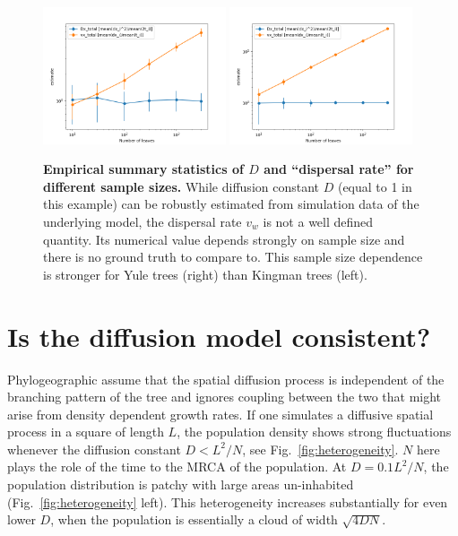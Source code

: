 \documentclass[aps,rmp, onecolumn]{revtex4}
\begin{document}
\begin{figure}
    \includegraphics*[width=0.48\textwidth]{figures/kingman_total_dispersal.png}
    \includegraphics*[width=0.48\textwidth]{figures/yule_total_dispersal.png}
    \caption{\label{fig:D_and_v}{\bf Empirical summary statistics of $D$ and ``dispersal rate'' for different sample sizes.}
    While diffusion constant $D$ (equal to 1 in this example) can be robustly estimated from simulation data of the underlying model, the dispersal rate $v_w$ is not a well defined quantity. Its numerical value depends strongly on sample size and there is no ground truth to compare to. This sample size dependence is stronger for Yule trees (right) than Kingman trees (left). }
\end{figure}

\section*{Is the diffusion model consistent?}
Phylogeographic assume that the spatial diffusion process is independent of the branching pattern of the tree and ignores coupling between the two that might arise from density dependent growth rates.
If one simulates a diffusive spatial process in a square of length $L$, the population density shows strong fluctuations whenever the diffusion constant $D<L^2/N$, see Fig.~\ref{fig:heterogeneity}.
$N$ here plays the role of the time to the MRCA of the population.
At $D=0.1L^2/N$, the population distribution is patchy with large areas un-inhabited (Fig.~\ref{fig:heterogeneity} left).
This heterogeneity increases substantially for even lower $D$, when the population is essentially a cloud of width $\sqrt{4DN}$.
\end{document}
